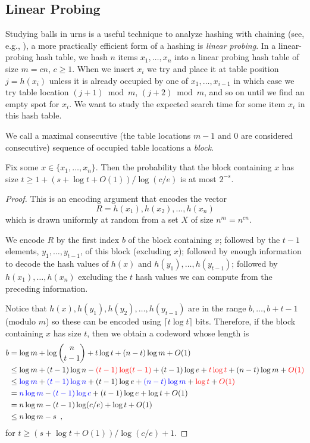 \documentclass{patmorin}
\begin{document}
\subsection{Linear Probing}

Studying balls in urns is a useful technique to analyze hashing with
chaining (see, e.g., \cite[Section~5.1]{morin:open}), a more practically
efficient form of a hashing is \emph{linear probing}.  In a linear-probing
hash table, we hash $n$ items $x_1,\ldots,x_n$ into a linear probing hash
table of size $m=cn$, $c\ge 1$. When we insert $x_i$ we try and place
it at table position $j=h(x_i)$ unless it is already occupied by one of
$x_1,\ldots,x_{i-1}$ in which case we try table location $(j+1)\bmod m$,
$(j+2)\bmod m$, and so on until we find an empty spot for $x_i$.  We want
to study the expected search time for some item $x_i$ in this hash table.

We call a maximal consecutive (the table locations $m-1$ and
$0$ are considered consecutive) sequence of occupied table locations
a \emph{block}.

\begin{thm}
  Fix some $x\in\{x_1,\ldots,x_n\}$. Then the probability that the block
  containing $x$ has size $t\ge 1+(s+\log t + O(1))/\log(c/e)$ is at most $2^{-s}$.
\end{thm}

\begin{proof}
  This is an encoding argument that encodes the vector 
  \[
     R = h(x_1),h(x_2),\ldots,h(x_n)
  \]
  which is drawn uniformly at random from a set $X$ of size $n^{m}=n^{cn}$.
  
  We encode $R$ by the first index $b$ of the block containing $x$;
  followed by the $t-1$ elements, $y_1,\ldots,y_{t-1}$, of this block
  (excluding $x$); followed by enough information to decode the hash
  values of $h(x)$ and $h(y_1),\ldots,h(y_{t-1})$; followed by
  $h(x_1),\ldots,h(x_n)$ excluding the $t$ hash values we can compute
  from the preceding information.

  Notice that $h(x),h(y_1),h(y_2),\ldots,h(y_{t-1})$ are in the range
  $b,\ldots,b+t-1$ (modulo $m$) so these can be encoded using $\lceil
  t\log t\rceil$ bits.  Therefore, if the block containing $x$ has size $t$,
  then we obtain a codeword whose length is
  \begin{align*}
    b & = \log m + \log\binom{n}{t-1} + t\log t + (n-t)\log m + O(1) \\
       & \le \log m + (t-1)\log n - 
           {\color{red}(t-1)\log(t-1)} + (t-1)\log e + {\color{red}t\log t} + (n-t)\log m + {\color{red}O(1)}\\
       & \le {\color{blue}\log m} + {\color{blue}(t-1)\log n} + (t-1)\log e + {\color{blue}(n-t)\log m} + {\color{red}\log t}+ {\color{red} O(1)}\\
       & = {\color{blue}n\log m} - {\color{blue}(t-1)\log c} + (t-1)\log e + \log t + O(1) \\
       & = n\log m - (t-1)\log(c/e) + \log t + O(1) \\
       & \le n\log m - s \enspace ,
  \end{align*}
  for $t\ge (s+\log t+O(1))/\log (c/e) + 1$.
\end{proof}
\end{document}
